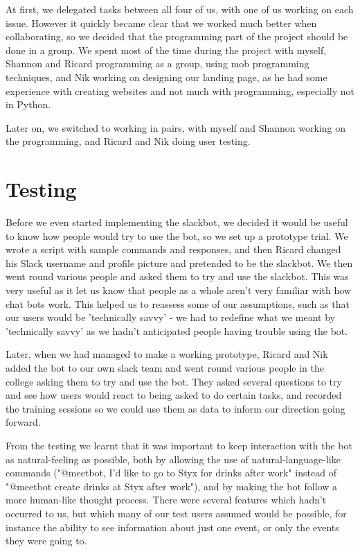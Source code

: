 \documentclass[12pt]{report}
\begin{document}
At first, we delegated tasks between all four of us, with one of us working on each issue. However it quickly became clear that we worked much better when collaborating, so we decided that the programming part of the project should be done in a group. We spent most of the time during the project with myself, Shannon and Ricard programming as a group, using mob programming techniques, and Nik working on designing our landing page, as he had some experience with creating websites and not much with programming, especially not in Python.

Later on, we switched to working in pairs, with myself and Shannon working on the programming, and Ricard and Nik doing user testing.

\section{Testing}
Before we even started implementing the slackbot, we decided it would be useful to know how people would try to use the bot, so we set up a prototype trial. We wrote a script with sample commands and responses, and then Ricard changed his Slack username and profile picture and pretended to be the slackbot. We then went round various people and asked them to try and use the slackbot. This was very useful as it let us know that people as a whole aren't very familiar with how chat bots work. This helped us to reassess some of our assumptions, such as that our users would be 'technically savvy' - we had to redefine what we meant by 'technically savvy' as we hadn't anticipated people having trouble using the bot.

Later, when we had managed to make a working prototype, Ricard and Nik added the bot to our own slack team and went round various people in the college asking them to try and use the bot. They asked several questions to try and see how users would react to being asked to do certain tasks, and recorded the training sessions so we could use them as data to inform our direction going forward.

From the testing we learnt that it was important to keep interaction with the bot as natural-feeling as possible, both by allowing the use of natural-language-like commands ("@meetbot, I'd like to go to Styx for drinks after work" instead of "@meetbot create drinks at Styx after work"), and by making the bot follow a more human-like thought process. There were several features which hadn't occurred to us, but which many of our test users assumed would be possible, for instance the ability to see information about just one event, or only the events they were going to.
\end{document}
